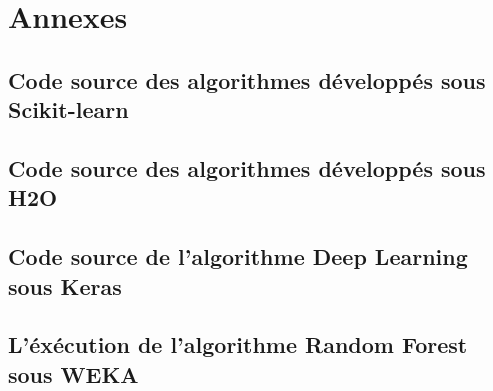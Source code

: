 \documentclass[a4paper,twoside,12pt]{book}
\newcommand\newpart[1]{
\part*{#1}
}
\begin{document}
\listoffigures
\let\cleardoublepage\clearpage
\listoftables
\let\cleardoublepage\clearpage


\mainmatter

\markboth{}{}
\setcounter{mtc}{9}



\newpage
\markboth{}{}
\setcounter{mtc}{10}



\newpage
\markboth{}{}
\setcounter{mtc}{11}



\newpage
\markboth{}{}
\setcounter{mtc}{12}


\newpage
\setcounter{mtc}{13}



\newpage


\markboth{}{}
\newpart{Annexes}
\appendix


\chapter{Code source des algorithmes développés sous Scikit-learn}


\chapter{Code source des algorithmes développés sous H2O}


\chapter{Code source de l'algorithme Deep Learning sous Keras}


\chapter{L'éxécution de l'algorithme Random Forest sous WEKA}



\backmatter
\cleardoublepage
\adjustmtc

%

 
\end{document}
